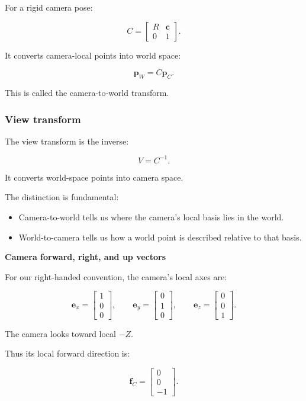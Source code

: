 For a rigid camera pose:

\[
 \boxed{ C= \begin{bmatrix} R&\mathbf c\\ 0&1 \end{bmatrix} }.
\]

It converts camera-local points into world space:

\[
 \mathbf p_W=C\mathbf p_C.
\]

This is called the camera-to-world transform.

\subsubsection{View transform}\label{view-transform}

The view transform is the inverse:

\[
 \boxed{V=C^{-1}}.
\]

It converts world-space points into camera space.

The distinction is fundamental:

\begin{itemize}
\tightlist
\item
  Camera-to-world tells us where the camera's local basis lies in the world.
\item
  World-to-camera tells us how a world point is described relative to that basis.
\end{itemize}

\textbf{Camera forward, right, and up vectors}

For our right-handed convention, the camera's local axes are:

\[
 \mathbf e_x= \begin{bmatrix}1\\0\\0\end{bmatrix}, \qquad \mathbf e_y= \begin{bmatrix}0\\1\\0\end{bmatrix}, \qquad \mathbf e_z= \begin{bmatrix}0\\0\\1\end{bmatrix}.
\]

The camera looks toward local \(-Z\).

Thus its local forward direction is:

\[
 \boxed{ \mathbf f_C= \begin{bmatrix}0\\0\\-1\end{bmatrix} }.
\]

